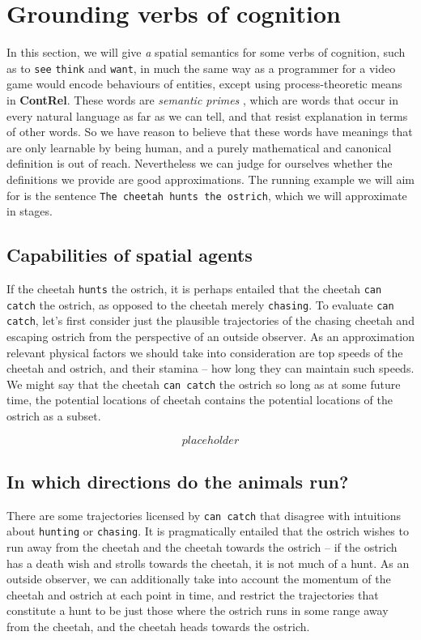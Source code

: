 \section{Grounding verbs of cognition}

In this section, we will give \emph{a} spatial semantics for some verbs of cognition, such as to \texttt{see} \texttt{think} and \texttt{want}, in much the same way as a programmer for a video game would encode behaviours of entities, except using process-theoretic means in \textbf{ContRel}. These words are \emph{semantic primes} \citep{}, which are words that occur in every natural language as far as we can tell, and that resist explanation in terms of other words. So we have reason to believe that these words have meanings that are only learnable by being human, and a purely mathematical and canonical definition is out of reach. Nevertheless we can judge for ourselves whether the definitions we provide are good approximations. The running example we will aim for is the sentence \texttt{The cheetah hunts the ostrich}, which we will approximate in stages.\\

\subsection{Capabilities of spatial agents}

If the cheetah \texttt{hunts} the ostrich, it is perhaps entailed that the cheetah \texttt{can catch} the ostrich, as opposed to the cheetah merely \texttt{chasing}. To evaluate \texttt{can catch}, let's first consider just the plausible trajectories of the chasing cheetah and escaping ostrich from the perspective of an outside observer. As an approximation relevant physical factors we should take into consideration are top speeds of the cheetah and ostrich, and their stamina -- how long they can maintain such speeds. We might say that the cheetah \texttt{can catch} the ostrich so long as at some future time, the potential locations of cheetah contains the potential locations of the ostrich as a subset.

\[placeholder\]

\subsection{In which directions do the animals run?}

There are some trajectories licensed by \texttt{can catch} that disagree with intuitions about \texttt{hunting} or \texttt{chasing}. It is pragmatically entailed that the ostrich wishes to run away from the cheetah and the cheetah towards the ostrich -- if the ostrich has a death wish and strolls towards the cheetah, it is not much of a hunt. As an outside observer, we can additionally take into account the momentum of the cheetah and ostrich at each point in time, and restrict the trajectories that constitute a hunt to be just those where the ostrich runs in some range away from the cheetah, and the cheetah heads towards the ostrich.

